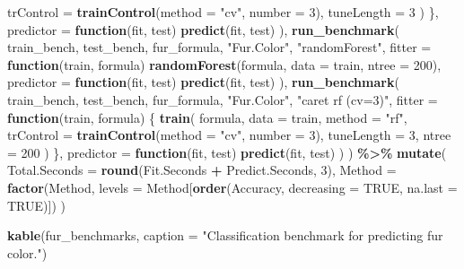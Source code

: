 \documentclass[
  11pt,
]{article}
\newenvironment{Shaded}{\begin{snugshade}}{\end{snugshade}}
\newcommand{\AttributeTok}[1]{\textcolor[rgb]{0.13,0.29,0.53}{#1}}
\newcommand{\ConstantTok}[1]{\textcolor[rgb]{0.56,0.35,0.01}{#1}}
\newcommand{\ControlFlowTok}[1]{\textcolor[rgb]{0.13,0.29,0.53}{\textbf{#1}}}
\newcommand{\DecValTok}[1]{\textcolor[rgb]{0.00,0.00,0.81}{#1}}
\newcommand{\FunctionTok}[1]{\textcolor[rgb]{0.13,0.29,0.53}{\textbf{#1}}}
\newcommand{\NormalTok}[1]{#1}
\newcommand{\SpecialCharTok}[1]{\textcolor[rgb]{0.81,0.36,0.00}{\textbf{#1}}}
\newcommand{\StringTok}[1]{\textcolor[rgb]{0.31,0.60,0.02}{#1}}
\begin{document}
\begin{Shaded}
\begin{Highlighting}[]
        \AttributeTok{trControl =} \FunctionTok{trainControl}\NormalTok{(}\AttributeTok{method =} \StringTok{"cv"}\NormalTok{, }\AttributeTok{number =} \DecValTok{3}\NormalTok{),}
        \AttributeTok{tuneLength =} \DecValTok{3}
\NormalTok{      )}
\NormalTok{    \},}
    \AttributeTok{predictor =} \ControlFlowTok{function}\NormalTok{(fit, test) }\FunctionTok{predict}\NormalTok{(fit, test)}
\NormalTok{  ),}
  \FunctionTok{run\_benchmark}\NormalTok{(}
\NormalTok{    train\_bench, test\_bench, fur\_formula, }\StringTok{"Fur.Color"}\NormalTok{, }\StringTok{"randomForest"}\NormalTok{,}
    \AttributeTok{fitter =} \ControlFlowTok{function}\NormalTok{(train, formula) }\FunctionTok{randomForest}\NormalTok{(formula, }\AttributeTok{data =}\NormalTok{ train, }\AttributeTok{ntree =} \DecValTok{200}\NormalTok{),}
    \AttributeTok{predictor =} \ControlFlowTok{function}\NormalTok{(fit, test) }\FunctionTok{predict}\NormalTok{(fit, test)}
\NormalTok{  ),}
  \FunctionTok{run\_benchmark}\NormalTok{(}
\NormalTok{    train\_bench, test\_bench, fur\_formula, }\StringTok{"Fur.Color"}\NormalTok{, }\StringTok{"caret rf (cv=3)"}\NormalTok{,}
    \AttributeTok{fitter =} \ControlFlowTok{function}\NormalTok{(train, formula) \{}
      \FunctionTok{train}\NormalTok{(}
\NormalTok{        formula, }\AttributeTok{data =}\NormalTok{ train, }\AttributeTok{method =} \StringTok{"rf"}\NormalTok{,}
        \AttributeTok{trControl =} \FunctionTok{trainControl}\NormalTok{(}\AttributeTok{method =} \StringTok{"cv"}\NormalTok{, }\AttributeTok{number =} \DecValTok{3}\NormalTok{),}
        \AttributeTok{tuneLength =} \DecValTok{3}\NormalTok{,}
        \AttributeTok{ntree =} \DecValTok{200}
\NormalTok{      )}
\NormalTok{    \},}
    \AttributeTok{predictor =} \ControlFlowTok{function}\NormalTok{(fit, test) }\FunctionTok{predict}\NormalTok{(fit, test)}
\NormalTok{  )}
\NormalTok{) }\SpecialCharTok{\%\textgreater{}\%}
  \FunctionTok{mutate}\NormalTok{(}
    \AttributeTok{Total.Seconds =} \FunctionTok{round}\NormalTok{(Fit.Seconds }\SpecialCharTok{+}\NormalTok{ Predict.Seconds, }\DecValTok{3}\NormalTok{),}
    \AttributeTok{Method =} \FunctionTok{factor}\NormalTok{(Method, }\AttributeTok{levels =}\NormalTok{ Method[}\FunctionTok{order}\NormalTok{(Accuracy, }\AttributeTok{decreasing =} \ConstantTok{TRUE}\NormalTok{, }\AttributeTok{na.last =} \ConstantTok{TRUE}\NormalTok{)])}
\NormalTok{  )}

\FunctionTok{kable}\NormalTok{(fur\_benchmarks, }\AttributeTok{caption =} \StringTok{"Classification benchmark for predicting fur color."}\NormalTok{)}
\end{Highlighting}
\end{Shaded}
\end{document}
